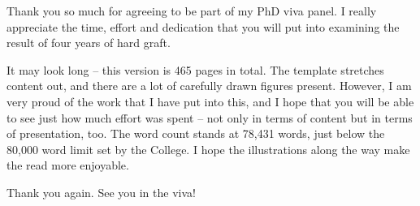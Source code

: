 
\begin{preamble}
{}

Thank you so much for agreeing to be part of my PhD viva panel. I really appreciate the time, effort and dedication that you will put into examining the result of four years of hard graft.

It may look long -- this version is 465 pages in total. The template stretches content out, and there are a lot of carefully drawn figures present. However, I am very proud of the work that I have put into this, and I hope that you will be able to see just how much effort was spent -- not only in terms of content but in terms of presentation, too. The word count stands at 78,431 words, just below the 80,000 word limit set by the College. I hope the illustrations along the way make the read more enjoyable.

Thank you again. See you in the viva!
\end{preamble}